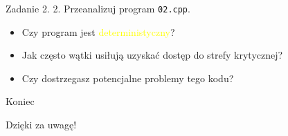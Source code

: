 \documentclass[aspectratio=169]{beamer}
\begin{document}
\begin{frame}[fragile]{Zadanie 2.}
2. Przeanalizuj program \texttt{02.cpp}.
  \begin{itemize}
    \item{} Czy program jest \textcolor{yellow}{deterministyczny}?
    \item{} Jak często wątki usiłują uzyskać dostęp do strefy krytycznej?
    \item{} Czy dostrzegasz potencjalne problemy tego kodu?
  \end{itemize}
\end{frame}

\begin{frame}[fragile]{Koniec}
  \begin{center}
    {\huge Dzięki za uwagę!}
  \end{center}
\end{frame}
\end{document}
